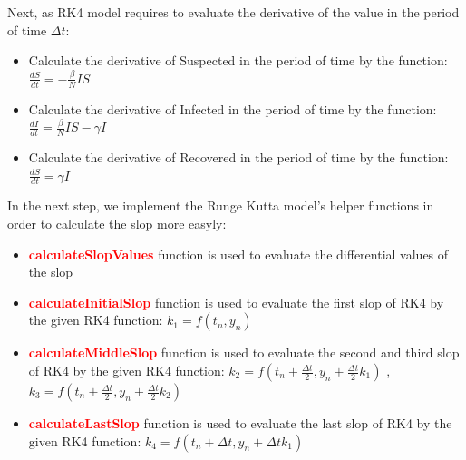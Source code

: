 \documentclass[a4paper]{article}
\begin{document}
        Next, as RK4 model requires to evaluate the derivative of the value in the period of time $\Delta t$:
        \begin{itemize}
            \item Calculate the derivative of Suspected in the period of time by the function: $\frac{dS}{dt} = -\frac{\beta}{N}IS$
            
            
            \item Calculate the derivative of Infected in the period of time by the function: $\frac{dI}{dt} = \frac{\beta}{N}IS - {\gamma} I$
            
            
            \item Calculate the derivative of Recovered in the period of time by the function: $\frac{dS}{dt} = {\gamma} I$
            
        \end{itemize}
        
        In the next step, we implement the Runge Kutta model's helper functions in order to calculate the slop more easyly:
        \begin{itemize}
            \item \textbf{\textcolor{red}{calculateSlopValues}} function is used to evaluate the differential values of the slop
            
            
            \item \textbf{\textcolor{red}{calculateInitialSlop}} function is used to evaluate the first slop of RK4 by the given RK4 function: ${k_1} = f(t_n, y_n)$
            
            
            \item \textbf{\textcolor{red}{calculateMiddleSlop}} function is used to evaluate the second and third slop of RK4 by the given RK4 function: ${k_2} = f(t_n + \frac{\Delta t}{2}, y_n + \frac{\Delta t}{2}k_1)$ , ${k_3} = f(t_n + \frac{\Delta t}{2}, y_n + \frac{\Delta t}{2}k_2)$
            
            
            \item \textbf{\textcolor{red}{calculateLastSlop}} function is used to evaluate the last slop of RK4 by the given RK4 function: ${k_4} = f(t_n + {\Delta t}, y_n + {\Delta t}k_1)$
            
        \end{itemize}
        
\end{document}
